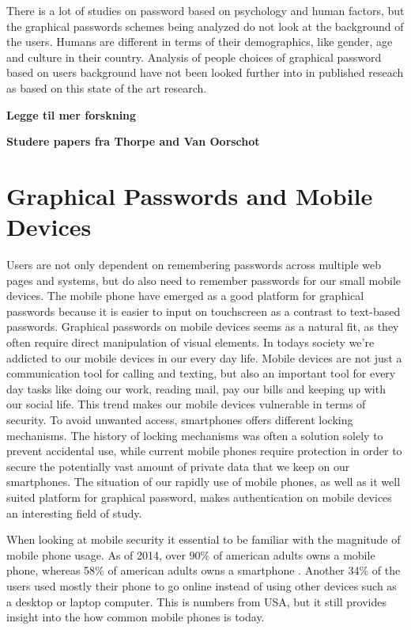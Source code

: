   There is a lot of studies on password based on psychology and human factors, but the graphical passwords schemes being analyzed do not look at the background of the users. Humans are different in terms of their demographics, like gender, age and culture in their country. Analysis of people choices of graphical password based on users background have not been looked further into in published reseach as based on this state of the art research. 


  {\bf \color{red} Legge til mer forskning}

  {\bf \color{red} Studere papers fra Thorpe and Van Oorschot}
  

\section{Graphical Passwords and Mobile Devices}
  Users are not only dependent on remembering passwords across multiple web pages and systems, but do also need to remember passwords for our small mobile devices. The mobile phone have emerged as a good platform for graphical passwords because it is easier to input on touchscreen as a contrast to text-based passwords. Graphical passwords on mobile devices seems as a natural fit, as they often require direct manipulation of visual elements. In todays society we're addicted to our mobile devices in our every day life. Mobile devices are not just a communication tool for calling and texting, but also an important tool for every day tasks like doing our work, reading mail, pay our bills and keeping up with our social life. This trend makes our mobile devices vulnerable in terms of security. To avoid unwanted access, smartphones offers different locking mechanisms. The history of locking mechanisms was often a solution solely to prevent accidental use, while current mobile phones require protection in order to secure the potentially vast amount of private data that we keep on our smartphones. The situation of our rapidly use of mobile phones, as well as it well suited platform for graphical password, makes authentication on mobile devices an interesting field of study.

  When looking at mobile security it essential to be familiar with the magnitude of mobile phone usage. As of 2014, over 90\% of american adults owns a mobile phone, whereas 58\% of american adults owns a smartphone \cite{MobileUseage}. Another 34\% of the users used mostly their phone to go online instead of using other devices such as a desktop or laptop computer. This is numbers from USA, but it still provides insight into the how common mobile phones is today.

